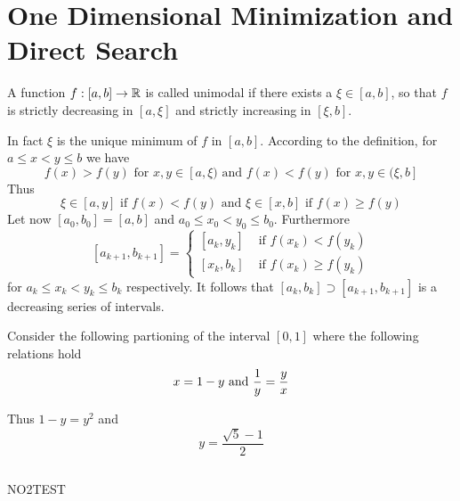 
\newpage
\section{One Dimensional Minimization and Direct Search}


\begin{definition}\label{def:unimodal_fnc}
A function \( f : [a,b] \to \mathbb{R} \) is called unimodal if there exists a \( \xi \in [a,b] \), so that
\( f \) is strictly decreasing in \( [a, \xi] \) and strictly increasing in \( [\xi, b] \).
\end{definition}
\bigskip

In fact \( \xi \) is the unique minimum of \( f \) in \( [a, b] \). According to the definition, 
for \( a \le x < y \le b \) we have 
\[
    f(x) > f(y) \text{ for } x, y \in [a, \xi) \text{ and } f(x) < f(y) \text{ for }  x, y \in (\xi, b]
\]
Thus
\[
    \xi \in [a, y] \text{ if } f(x) < f(y) \text{ and } \xi \in [x, b] \text{ if } f(x) \ge f(y)
\]
Let now \( [a_0, b_0] = [a, b] \) and \(a_0 \le x_0 < y_0 \le b_0 \). Furthermore
\[
    [a_{k + 1}, b_{k + 1}] = 
        \begin{cases}
            [a_k, y_k] & \text{ if } f(x_k) < f(y_k)  \\
            [x_k, b_k] & \text{ if } f(x_k) \ge f(y_k)
        \end{cases}
\]
for \( a_k \le x_k < y_k \le b_k \) respectively. It follows that \( [a_k, b_k] \supset [a_{k + 1}, b_{k + 1}] \) 
is a decreasing series of intervals.

Consider the following partioning of the interval \( [0, 1] \) where the following relations hold 
\[
     x = 1 - y \text{ and } \\ \frac{1}{y} = \frac{y}{x}
\]

Thus \( 1 - y = y^2 \) and
\[ 
     y = \frac{\sqrt{5} - 1}{2}
\]
\bigskip

\label{algo:golden_section_search}\hfill
\bigskip
\inputminted{python}{golden_section.py}
\bigskip

NO2TEST


